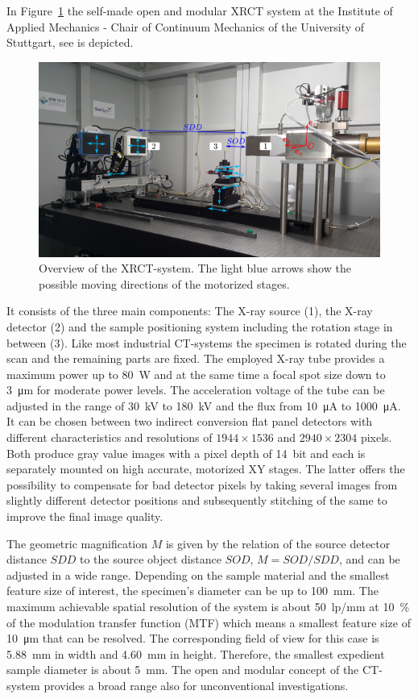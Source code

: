 In Figure~\ref{fig:CTsystem} the self-made open and modular {\textmu}XRCT system at the Institute of Applied Mechanics - Chair of Continuum Mechanics of the University of Stuttgart, see \textcolor{red}{\cite{Ruf2020}} is depicted. 
\begin{figure}[ht]
\centering
\includegraphics[width=1.0\textwidth]{figures/exp_2_2_xray_main.png}
\caption{Overview of the {\textmu}XRCT-system. The light blue arrows show the possible moving directions of the motorized stages.}
\label{fig:CTsystem}
\end{figure}
It consists of the three main components: The X-ray source (1), the X-ray detector (2) and the sample positioning system including the rotation stage in between (3). Like most industrial CT-systems the specimen is rotated during the scan and the remaining parts are fixed. The employed X-ray tube provides a maximum power up to \SI{80}{\watt} and at the same time a focal spot size down to \SI{3}{\micro\meter} for moderate power levels. The acceleration voltage of the tube can be adjusted in the range of \SI{30}{\kilo\volt} to \SI{180}{\kilo\volt} and the flux from \SI{10}{\micro\ampere} to \SI{1000}{\micro\ampere}. It can be chosen between two indirect conversion flat panel detectors with different characteristics and resolutions of $1944 \times 1536$ and $2940 \times 2304$ pixels. Both produce gray value images with a pixel depth of \SI{14}{bit} and each is separately mounted on high accurate, motorized XY stages. The latter offers the possibility to compensate for bad detector pixels by taking several images from slightly different detector positions and subsequently stitching of the same to improve the final image quality.

The geometric magnification $M$ is given by the relation of the source detector distance $SDD$ to the source object distance $SOD$, $M = SOD/SDD$, and can be adjusted in a wide range. Depending on the sample material and the smallest feature size of interest, the specimen's diameter can be up to \SI{100}{\milli\meter}. The maximum achievable spatial resolution of the system is about \SI{50}{lp/mm} at \SI{10}{\%} of the modulation transfer function (MTF) which means a smallest feature size of \SI{10}{\micro\meter} that can be resolved. The corresponding field of view for this case is \SI{5.88}{\milli\meter} in width and \SI{4.60}{\milli\meter} in height. Therefore, the smallest expedient sample diameter is about \SI{5}{\milli\meter}. The open and modular concept of the CT-system provides a broad range also for unconventional investigations.

